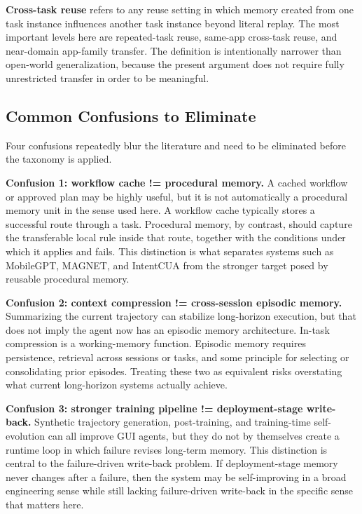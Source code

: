 \documentclass{article}
\begin{document}
\textbf{Cross-task reuse} refers to any reuse setting in which memory
created from one task instance influences another task instance beyond
literal replay. The most important levels here are repeated-task reuse,
same-app cross-task reuse, and near-domain app-family transfer. The
definition is intentionally narrower than open-world generalization,
because the present argument does not require fully unrestricted
transfer in order to be meaningful.

\subsection{Common Confusions to
Eliminate}\label{33-common-confusions-to-eliminate}

Four confusions repeatedly blur the literature and need to be eliminated
before the taxonomy is applied.

\textbf{Confusion 1: workflow cache != procedural memory.} A cached
workflow or approved plan may be highly useful, but it is not
automatically a procedural memory unit in the sense used here. A
workflow cache typically stores a successful route through a task.
Procedural memory, by contrast, should capture the transferable local
rule inside that route, together with the conditions under which it
applies and fails. This distinction is what separates systems such as
MobileGPT, MAGNET, and IntentCUA from the stronger target posed by
reusable procedural memory.

\textbf{Confusion 2: context compression != cross-session episodic
memory.} Summarizing the current trajectory can stabilize long-horizon
execution, but that does not imply the agent now has an episodic memory
architecture. In-task compression is a working-memory function. Episodic
memory requires persistence, retrieval across sessions or tasks, and
some principle for selecting or consolidating prior episodes. Treating
these two as equivalent risks overstating what current long-horizon
systems actually achieve.

\textbf{Confusion 3: stronger training pipeline != deployment-stage
write-back.} Synthetic trajectory generation, post-training, and
training-time self-evolution can all improve GUI agents, but they do not
by themselves create a runtime loop in which failure revises long-term
memory. This distinction is central to the failure-driven write-back
problem. If deployment-stage memory never changes after a failure, then
the system may be self-improving in a broad engineering sense while
still lacking failure-driven write-back in the specific sense that
matters here.
\end{document}

